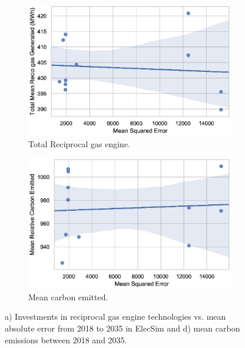 \documentclass[final,3p,times,twocolumn,numbers]{elsarticle}
\begin{document}
\begin{figure}[h!]
\centering
\begin{subfigure}[b]{0.33\textwidth}   
\includegraphics[width=\columnwidth]{figures/results/elecsim_results/results_2/total_Recip_gas_mean_output.eps}
\caption{Total Reciprocal gas engine.}
\label{fig:total_Recip_gas_mean_output.eps}
\end{subfigure}
\hfil
\begin{subfigure}[b]{0.33\textwidth}   
\includegraphics[width=\columnwidth]{figures/results/elecsim_results/results_2/Carbon_emitted_mean_output.eps}
\caption{Mean carbon emitted.}
\label{fig:Carbon_emitted_mean_output}
\end{subfigure}
\label{fig:nuclear_pv_carbon_totals}
\caption{a) Investments in reciprocal gas engine technologies vs. mean absolute error from 2018 to 2035 in ElecSim and d) mean carbon emissions between 2018 and 2035.}
\end{figure}
\end{document}
